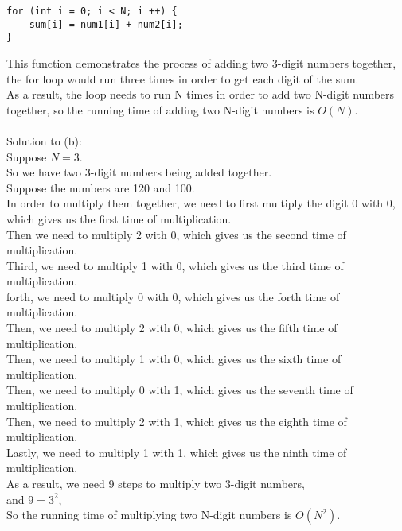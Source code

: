 \documentclass[12pt]{article}
\begin{document}
\begin{enumerate}
\begin{verbatim}
for (int i = 0; i < N; i ++) {
 	sum[i] = num1[i] + num2[i];
}
\end{verbatim}
This function demonstrates the process of adding two 3-digit numbers together, the for loop would run three times in order to get each digit of the sum. 
\\As a result, the loop needs to run N times in order to add two N-digit numbers together, so the running time of adding two N-digit numbers is $O(N)$.
\\\\Solution to (b):
\\Suppose $N = 3$.
\\So we have two 3-digit numbers being added together.
\\Suppose the numbers are 120 and 100.
\\In order to multiply them together, we need to first multiply the digit 0 with 0, which gives us the first time of multiplication.
\\Then we need to multiply 2 with 0, which gives us the second time of multiplication.
\\Third, we need to multiply 1 with 0, which gives us the third time of multiplication.
\\forth, we need to multiply 0 with 0, which gives us the forth time of multiplication.
\\Then, we need to multiply 2 with 0, which gives us the fifth time of multiplication.
\\Then, we need to multiply 1 with 0, which gives us the sixth time of multiplication.
\\Then, we need to multiply 0 with 1, which gives us the seventh time of multiplication.
\\Then, we need to multiply 2 with 1, which gives us the eighth time of multiplication.
\\Lastly, we need to multiply 1 with 1, which gives us the ninth time of multiplication.
\\As a result, we need 9 steps to multiply two 3-digit numbers, 
\\and $ 9 = 3^2$,
\\So the running time of multiplying two N-digit numbers is $O(N^2)$.
\\\\

\end{enumerate}
\end{document}
